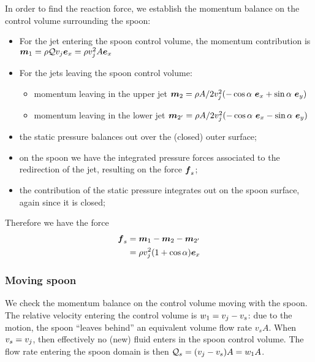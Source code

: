In order to find the reaction force, we establish the momentum balance
on the control volume surrounding the spoon:
\begin{itemize}
\item For the jet entering the spoon control volume, the momentum
  contribution is $\boldsymbol{m}_1 = \rho \mathcal Q v_j \boldsymbol e_{x} = \rho
  v_j^2 A \boldsymbol e_{x}$
\item For the jets leaving the spoon control volume:
  \begin{itemize}
  \item momentum leaving in the upper jet $\boldsymbol{m}_{2} = \rho
    A/2 v_j^2 (- \cos{\alpha}~\boldsymbol e_{x} + \sin{\alpha}~\boldsymbol e_{y})$
  \item momentum leaving in the lower jet $\boldsymbol{m}_{2'} = \rho
    A/2 v_j^2 (- \cos{\alpha}~\boldsymbol e_{x} - \sin{\alpha}~\boldsymbol e_{y})$
    \end{itemize}
  \item the static pressure balances out over the (closed) outer
    surface;
  \item on the spoon we have the integrated pressure forces associated
    to the redirection of the jet, resulting on the force $\boldsymbol {f}_s$;
  \item the contribution of the static pressure integrates out on the
    spoon surface, again since it is closed;
\end{itemize}
Therefore we have the force 
\begin{align*}
  \boldsymbol {f}_s &= \boldsymbol{m}_1 - \boldsymbol{m}_{2} - \boldsymbol{m}_{2'} \\
  &= \rho v_j^2 (1 +  \cos{\alpha}) \boldsymbol e_{x} \\
\end{align*}

\subsubsection*{Moving spoon}

We check the momentum balance on the control volume moving with the
spoon. The relative velocity entering the control volume is $w_1 =
v_j - v_s$: due to the motion, the spoon ``leaves behind'' an
equivalent volume flow rate $v_s A$. When $v_s = v_j$, then
effectively no (new) fluid enters in the spoon control volume. The
flow rate entering the spoon domain is then $\mathcal Q_s = (v_j -
v_s) A = w_1 A$.

